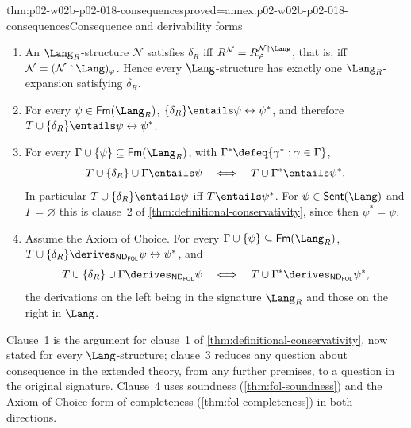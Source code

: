 \begin{hbcorollary}{thm:p02-w02b-p02-018-consequences}{proved=annex:p02-w02b-p02-018-consequences}{Consequence and derivability forms}
\begin{enumerate}
 \item An \(\Lang_R\)-structure \(\mathcal N\) satisfies \(\delta_R\) iff
       \(R^{\mathcal N}=R^{\mathcal N\mathbin{\upharpoonright}\Lang}_{\varphi}\),
       that is, iff
       \(\mathcal N=(\mathcal N\mathbin{\upharpoonright}\Lang)_{\varphi}\).
       Hence every \(\Lang\)-structure has exactly one \(\Lang_R\)-expansion
       satisfying \(\delta_R\).
 \item For every \(\psi\in\mathsf{Fm}(\Lang_R)\),
       \(\{\delta_R\}\entails\psi\leftrightarrow\psi^{*}\), and therefore
       \(T\cup\{\delta_R\}\entails\psi\leftrightarrow\psi^{*}\).
 \item For every \(\Gamma\cup\{\psi\}\subseteq\mathsf{Fm}(\Lang_R)\), with
       \(\Gamma^{*}\defeq\{\gamma^{*}:\gamma\in\Gamma\}\),
       \[
        T\cup\{\delta_R\}\cup\Gamma\entails\psi
        \quad\Longleftrightarrow\quad
        T\cup\Gamma^{*}\entails\psi^{*}.
       \]
       In particular \(T\cup\{\delta_R\}\entails\psi\) iff
       \(T\entails\psi^{*}\).  For \(\psi\in\mathsf{Sent}(\Lang)\) and
       \(\Gamma=\varnothing\) this is clause~2 of
       \cref{thm:definitional-conservativity}, since then
       \(\psi^{*}=\psi\).
 \item Assume the Axiom of Choice.  For every
       \(\Gamma\cup\{\psi\}\subseteq\mathsf{Fm}(\Lang_R)\),
       \(T\cup\{\delta_R\}\derives_{\mathsf{ND}_{\mathsf{FOL}}}
       \psi\leftrightarrow\psi^{*}\), and
       \[
        T\cup\{\delta_R\}\cup\Gamma\derives_{\mathsf{ND}_{\mathsf{FOL}}}\psi
        \quad\Longleftrightarrow\quad
        T\cup\Gamma^{*}\derives_{\mathsf{ND}_{\mathsf{FOL}}}\psi^{*},
       \]
       the derivations on the left being in the signature \(\Lang_R\) and
       those on the right in \(\Lang\).
\end{enumerate}
\end{hbcorollary}

Clause~1 is the argument for clause~1 of
\cref{thm:definitional-conservativity}, now stated for every
\(\Lang\)-structure; clause~3 reduces any question about consequence in the
extended theory, from any further premises, to a question in the original
signature.  Clause~4 uses soundness (\cref{thm:fol-soundness}) and the
Axiom-of-Choice form of completeness (\cref{thm:fol-completeness}) in both
directions.


